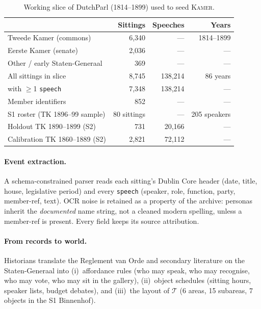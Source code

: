 \documentclass[sigconf,review,anonymous]{acmart}
\newcommand{\sys}{\textsc{Kamer}}
\begin{document}
\begin{table}[t]
\caption{Working slice of DutchParl (1814--1899) used to seed \sys{}.}
\label{tab:corpus}
\centering\small
\begin{tabular}{lrrr}
\toprule
 & Sittings & Speeches & Years \\
\midrule
Tweede Kamer (commons) & 6{,}340 & --- & 1814--1899 \\
Eerste Kamer (senate) & 2{,}036 & --- & --- \\
Other / early Staten-Generaal & 369 & --- & --- \\
\midrule
All sittings in slice & 8{,}745 & 138{,}214 & 86 years \\
\quad with $\geq$1 \texttt{speech} & 7{,}348 & 138{,}214 & --- \\
Member identifiers & 852 & --- & --- \\
S1 roster (TK 1896--99 sample) & 80 sittings & --- & 205 speakers \\
Holdout TK 1890--1899 (S2) & 731 & 20{,}166 & --- \\
Calibration TK 1860--1889 (S2) & 2{,}821 & 72{,}112 & --- \\
\bottomrule
\end{tabular}
\end{table}

\paragraph{Event extraction.} A schema-constrained parser reads each
sitting's Dublin Core header (date, title, house, legislative period) and
every \texttt{speech} (speaker, role, function, party, member-ref, text).
OCR noise is retained as a property of the archive: personas inherit the
\emph{documented} name string, not a cleaned modern spelling, unless a
member-ref is present. Every field keeps its source attribution.

\paragraph{From records to world.} Historians translate the Reglement van
Orde and secondary literature on the Staten-Generaal into
(i)~affordance rules (who may speak, who may recognise, who may vote, who
may sit in the gallery),
(ii)~object schedules (sitting hours, speaker lists, budget debates),
and (iii)~the layout of $\mathcal{T}$ (6 areas, 15 subareas, 7 objects in
the S1 Binnenhof).
\end{document}
